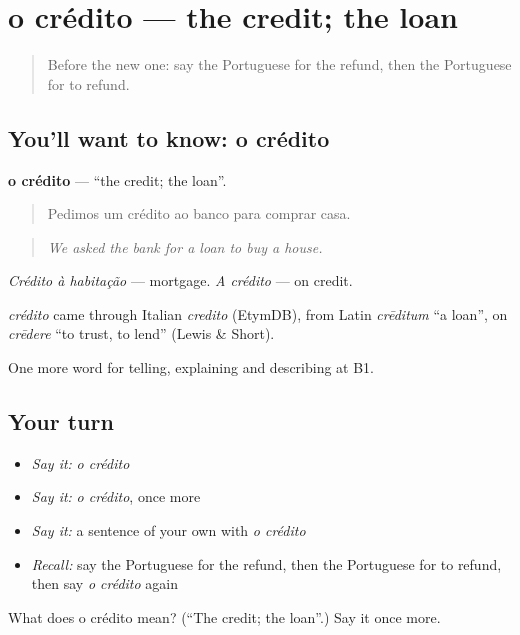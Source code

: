 \section[o crédito]{o crédito — the credit; the loan}

\label{lesson:PT-C394-credito}



\begin{quote}
Before the new one: say the Portuguese for the refund, then the Portuguese for to refund.
\end{quote}

\subsection*{You'll want to know: o crédito}
\textbf{o crédito} — \textquotedblleft{}the credit; the loan\textquotedblright{}.

\begin{quote}
Pedimos um crédito ao banco para comprar casa.
\end{quote}

\begin{quote}
\emph{We asked the bank for a loan to buy a house.}
\end{quote}

\emph{Crédito à habitação} — mortgage. \emph{A crédito} — on credit.

\begin{cousinweb}
\emph{crédito} came through Italian \emph{credito} (EtymDB), from Latin \emph{crēditum} \textquotedblleft{}a loan\textquotedblright{}, on \emph{crēdere} \textquotedblleft{}to trust, to lend\textquotedblright{} (Lewis \& Short).
\end{cousinweb}

\begin{grammarlens}[title={What you've built}]
One more word for telling, explaining and describing at B1.
\end{grammarlens}

\subsection*{Your turn}
\begin{itemize}
\raggedright
  \item \emph{Say it:} \emph{o crédito}
  \item \emph{Say it:} \emph{o crédito}, once more
  \item \emph{Say it:} a sentence of your own with \emph{o crédito}
  \item \emph{Recall:} say the Portuguese for the refund, then the Portuguese for to refund, then say \emph{o crédito} again
\end{itemize}

\begin{tcolorbox}[breakable,colback=teal!4,colframe=teal!35!black,title={Before you move on}]
What does o crédito mean? (\textquotedblleft{}The credit; the loan\textquotedblright{}.) Say it once more.
\end{tcolorbox}
